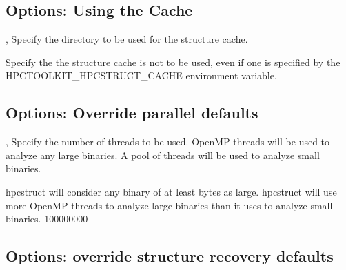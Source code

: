 \documentclass[english]{article}
\begin{document}
\subsection{Options: Using the Cache}
\item[\OptArg{-c}{dir}, \OptArg{--cache}{dir}]
Specify the directory to be used for the structure cache.

\item[\Opt{--nocache}]
Specify the the structure cache is not to be used, even if one is specified by the
HPCTOOLKIT_HPCSTRUCT_CACHE environment variable.

\subsection{Options: Override parallel defaults}
\item[\OptArg{-j}{num}, \OptArg{--jobs}{num}]
Specify the number of threads to be used. 
OpenMP threads will be used to analyze any large
binaries. A pool of  threads will be used to
analyze small binaries.

\item[\OptArg{--psize}{n}]
hpcstruct will consider any binary of at least
 bytes as large. hpcstruct will use more
OpenMP threads to analyze large binaries than
it uses to analyze small binaries.  {100000000}

\subsection{Options: override structure recovery defaults}
\end{document}
